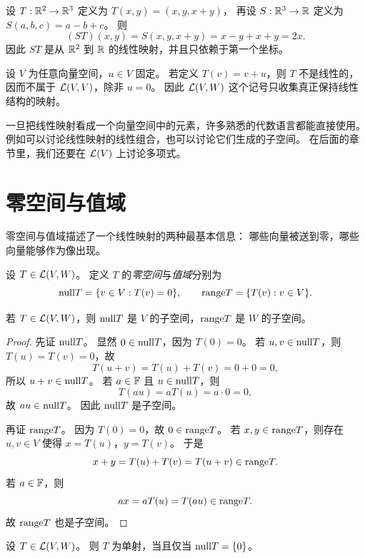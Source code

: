 \begin{example} 设 $T:\mathbb{R}^2\to\mathbb{R}^3$ 定义为 $T(x,y)=(x,y,x+y)$， 再设 $S:\mathbb{R}^3\to\mathbb{R}$ 定义为
$S(a,b,c)=a-b+c$。 则 \[ (ST)(x,y)=S(x,y,x+y)=x-y+x+y=2x. \] 因此 $ST$ 是从 $\mathbb{R}^2$ 到 $\mathbb{R}$
的线性映射，并且只依赖于第一个坐标。 \end{example}

\begin{example} 设 $V$ 为任意向量空间，$u\in V$ 固定。 若定义 $T(v)=v+u$，则 $T$ 不是线性的，因而不属于
$\mathcal{L}(V,V)$，除非 $u=0$。 因此 $\mathcal{L}(V,W)$ 这个记号只收集真正保持线性结构的映射。 \end{example}

\begin{remark} 一旦把线性映射看成一个向量空间中的元素，许多熟悉的代数语言都能直接使用。 例如可以讨论线性映射的线性组合，也可以讨论它们生成的子空间。
在后面的章节里，我们还要在 $\mathcal{L}(V)$ 上讨论多项式。 \end{remark}

\section{零空间与值域}

零空间与值域描述了一个线性映射的两种最基本信息： 哪些向量被送到零，哪些向量能够作为像出现。

\begin{definition} 设 $T\in\mathcal{L}(V,W)$。 定义 $T$ 的\emph{零空间}与\emph{值域}分别为 \[ \mathrm{null} T=\{v\in
V:T(v)=0\},\qquad \mathrm{range} T=\{T(v):v\in V\}. \] \end{definition}

\begin{proposition} 若 $T\in\mathcal{L}(V,W)$，则 $\mathrm{null} T$ 是 $V$ 的子空间，$\mathrm{range} T$ 是 $W$ 的子空间。
\end{proposition}

\begin{proof} 先证 $\mathrm{null} T$。 显然 $0\in\mathrm{null} T$，因为 $T(0)=0$。 若 $u,v\in\mathrm{null} T$，则
$T(u)=T(v)=0$，故 \[ T(u+v)=T(u)+T(v)=0+0=0, \] 所以 $u+v\in\mathrm{null} T$。 若 $a\in\mathbb{F}$ 且 $u\in\mathrm{null}
T$，则 \[ T(au)=aT(u)=a\cdot 0=0, \] 故 $au\in\mathrm{null} T$。 因此 $\mathrm{null} T$ 是子空间。

再证 $\mathrm{range} T$。 因为 $T(0)=0$，故 $0\in\mathrm{range} T$。 若 $x,y\in\mathrm{range} T$，则存在 $u,v\in V$ 使得
$x=T(u)$，$y=T(v)$。 于是 \[ x+y=T(u)+T(v)=T(u+v)\in\mathrm{range} T. \] 若 $a\in\mathbb{F}$，则 \[
ax=aT(u)=T(au)\in\mathrm{range} T. \] 故 $\mathrm{range} T$ 也是子空间。 \end{proof}

\begin{theorem} 设 $T\in\mathcal{L}(V,W)$。 则 $T$ 为单射，当且仅当 $\mathrm{null} T=\{0\}$。 \end{theorem}

